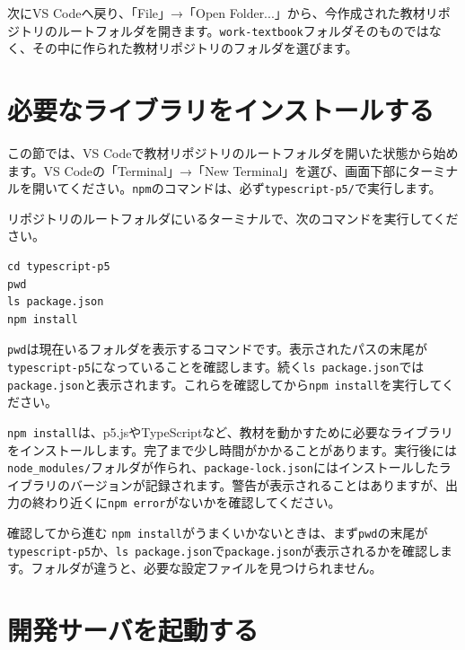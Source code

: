 次にVS Codeへ戻り、「File」→「Open Folder...」から、今作成された教材リポジトリのルートフォルダを開きます。\texttt{work-textbook}フォルダそのものではなく、その中に作られた教材リポジトリのフォルダを選びます。

\section{必要なライブラリをインストールする}

この節では、VS Codeで教材リポジトリのルートフォルダを開いた状態から始めます。VS Codeの「Terminal」→「New Terminal」を選び、画面下部にターミナルを開いてください。\texttt{npm}のコマンドは、必ず\texttt{typescript-p5/}で実行します。

リポジトリのルートフォルダにいるターミナルで、次のコマンドを実行してください。

\begin{listing}[htbp]
\begin{verbatim}
cd typescript-p5
pwd
ls package.json
npm install
\end{verbatim}
\caption{実行用プロジェクトで必要なライブラリをインストールするコマンド}
\label{lst:appendix-macos-npm-install}
\end{listing}

\texttt{pwd}は現在いるフォルダを表示するコマンドです。表示されたパスの末尾が\texttt{typescript-p5}になっていることを確認します。続く\texttt{ls package.json}では\texttt{package.json}と表示されます。これらを確認してから\texttt{npm install}を実行してください。

\texttt{npm install}は、p5.jsやTypeScriptなど、教材を動かすために必要なライブラリをインストールします。完了まで少し時間がかかることがあります。実行後には\texttt{node\_modules/}フォルダが作られ、\texttt{package-lock.json}にはインストールしたライブラリのバージョンが記録されます。警告が表示されることはありますが、出力の終わり近くに\texttt{npm error}がないかを確認してください。

\begin{pointbox}{確認してから進む}
\texttt{npm install}がうまくいかないときは、まず\texttt{pwd}の末尾が\texttt{typescript-p5}か、\texttt{ls package.json}で\texttt{package.json}が表示されるかを確認します。フォルダが違うと、必要な設定ファイルを見つけられません。
\end{pointbox}

\section{開発サーバを起動する}

